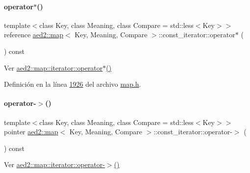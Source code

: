 \paragraph{\texorpdfstring{operator$\ast$()}{operator*()}}
{\footnotesize\ttfamily template$<$class Key, class Meaning, class Compare = std\+::less$<$\+Key$>$$>$ \\
reference \hyperlink{classaed2_1_1map}{aed2\+::map}$<$ Key, Meaning, Compare $>$\+::const\+\_\+iterator\+::operator$\ast$ (\begin{DoxyParamCaption}{ }\end{DoxyParamCaption}) const\hspace{0.3cm}{\ttfamily [inline]}}



Ver \hyperlink{classaed2_1_1map_1_1iterator_ab115711d0295146906830840590d900a_ab115711d0295146906830840590d900a}{aed2\+::map\+::iterator\+::operator$\ast$()} 



Definición en la línea \hyperlink{map_8h_source_l01926}{1926} del archivo \hyperlink{map_8h_source}{map.\+h}.

\mbox{\label{classaed2_1_1map_1_1const__iterator_a07700cccc763da67d42c84d20f4e1d1b_a07700cccc763da67d42c84d20f4e1d1b}} 
\paragraph{\texorpdfstring{operator-\/$>$()}{operator->()}}
{\footnotesize\ttfamily template$<$class Key, class Meaning, class Compare = std\+::less$<$\+Key$>$$>$ \\
pointer \hyperlink{classaed2_1_1map}{aed2\+::map}$<$ Key, Meaning, Compare $>$\+::const\+\_\+iterator\+::operator-\/$>$ (\begin{DoxyParamCaption}{ }\end{DoxyParamCaption}) const\hspace{0.3cm}{\ttfamily [inline]}}



Ver \hyperlink{classaed2_1_1map_1_1iterator_a712522d62f461c1eb9b02ecf248bae8c_a712522d62f461c1eb9b02ecf248bae8c}{aed2\+::map\+::iterator\+::operator-\/$>$()} 



